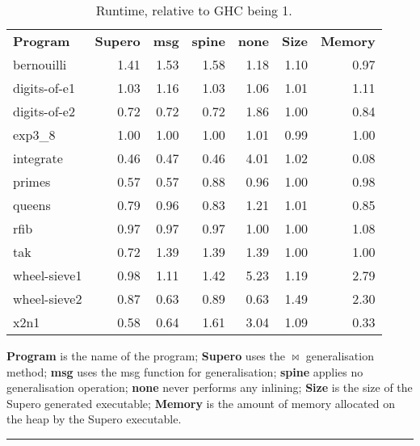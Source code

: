 \begin{table}

\begin{tabular}{lrrrrrr}
\textbf{Program} & \hspace{5mm}\textbf{Supero} & \hspace{5mm}\textbf{msg} & \hspace{5mm}\textbf{spine} & \hspace{5mm}\textbf{none} & \hspace{5mm}\textbf{Size} & \hspace{5mm}\textbf{Memory} \\
bernouilli 		& 1.41 & 1.53 & 1.58 & 1.18 & 1.10 & 0.97 \\
digits-of-e1	& 1.03 & 1.16 & 1.03 & 1.06 & 1.01 & 1.11 \\
digits-of-e2	& 0.72 & 0.72 & 0.72 & 1.86 & 1.00 & 0.84 \\
exp3\_8			& 1.00 & 1.00 & 1.00 & 1.01 & 0.99 & 1.00 \\
integrate 		& 0.46 & 0.47 & 0.46 & 4.01 & 1.02 & 0.08 \\
primes 			& 0.57 & 0.57 & 0.88 & 0.96 & 1.00 & 0.98 \\
queens 			& 0.79 & 0.96 & 0.83 & 1.21 & 1.01 & 0.85 \\
rfib 			& 0.97 & 0.97 & 0.97 & 1.00 & 1.00 & 1.08 \\
tak 			& 0.72 & 1.39 & 1.39 & 1.39 & 1.00 & 1.00 \\
wheel-sieve1 	& 0.98 & 1.11 & 1.42 & 5.23 & 1.19 & 2.79 \\
wheel-sieve2 	& 0.87 & 0.63 & 0.89 & 0.63 & 1.49 & 2.30 \\
x2n1 			& 0.58 & 0.64 & 1.61 & 3.04 & 1.09 & 0.33 \\
\end{tabular}
\vspace{2mm}

\textbf{Program} is the name of the program; \textbf{Supero} uses the $\bowtie$ generalisation method; \textbf{msg} uses the msg function for generalisation; \textbf{spine} applies no generalisation operation; \textbf{none} never performs any inlining; \textbf{Size} is the size of the Supero generated executable; \textbf{Memory} is the amount of memory allocated on the heap by the Supero executable.

\vspace{4mm}
\hrule
\vspace{2mm}
\caption{Runtime, relative to GHC being 1.}
\label{tab:haskell_results}
\end{table}

